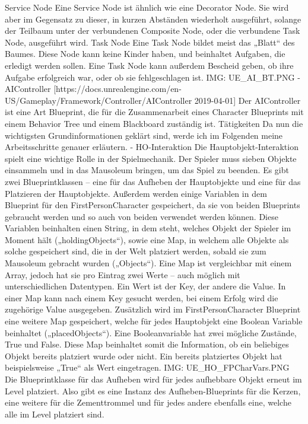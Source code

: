 Service Node
Eine Service Node ist ähnlich wie eine Decorator Node. Sie wird aber im Gegensatz zu dieser, in kurzen Abständen wiederholt ausgeführt, solange der Teilbaum unter der verbundenen Composite Node, oder die verbundene Task Node, ausgeführt wird.
Task Node
Eine Task Node bildet meist das „Blatt“ des Baumes. Diese Node kann keine Kinder haben, und beinhaltet Aufgaben, die erledigt werden sollen. Eine Task Node kann außerdem Bescheid geben, ob ihre Aufgabe erfolgreich war, oder ob sie fehlgeschlagen ist.
{IMG: UE_AI_BT.PNG}
-	AIController [https://docs.unrealengine.com/en-US/Gameplay/Framework/Controller/AIController 2019-04-01]
Der AIController ist eine Art Blueprint, die für die Zusammenarbeit eines Character Blueprints mit einem Behavior Tree und einem Blackboard zuständig ist.
Tätigkeiten
Da nun die wichtigsten Grundinformationen geklärt sind, werde ich im Folgenden meine Arbeitsschritte genauer erläutern.
-	HO-Interaktion
Die Hauptobjekt-Interaktion spielt eine wichtige Rolle in der Spielmechanik. Der Spieler muss sieben Objekte einsammeln und in das Mausoleum bringen, um das Spiel zu beenden.
Es gibt zwei Blueprintklassen – eine für das Aufheben der Hauptobjekte und eine für das Platzieren der Hauptobjekte. Außerdem werden einige Variablen in dem Blueprint für den FirstPersonCharacter gespeichert, da sie von beiden Blueprints gebraucht werden und so auch von beiden verwendet werden können. Diese Variablen beinhalten einen String, in dem steht, welches Objekt der Spieler im Moment hält („holdingObjects“), sowie eine Map, in welchem alle Objekte als solche gespeichert sind, die in der Welt platziert werden, sobald sie zum Mausoleum gebracht wurden („Objects“). Eine Map ist vergleichbar mit einem Array, jedoch hat sie pro Eintrag zwei Werte – auch möglich mit unterschiedlichen Datentypen. Ein Wert ist der Key, der andere die Value. In einer Map kann nach einem Key gesucht werden, bei einem Erfolg wird die zugehörige Value ausgegeben.
Zusätzlich wird im FirstPersonCharacter Blueprint eine weitere Map gespeichert, welche für jedes Hauptobjekt eine Boolean Variable beinhaltet („placedObjects“). Eine Booleanvariable hat zwei mögliche Zustände, True und False. Diese Map beinhaltet somit die Information, ob ein beliebiges Objekt bereits platziert wurde oder nicht. Ein bereits platziertes Objekt hat beispielsweise „True“ als Wert eingetragen.
{IMG: UE_HO_FPCharVars.PNG}
Die Blueprintklasse für das Aufheben wird für jedes aufhebbare Objekt erneut im Level platziert. Also gibt es eine Instanz des Aufheben-Blueprints für die Kerzen, eine weitere für die Zementtrommel und für jedes andere ebenfalls eine, welche alle im Level platziert sind.
